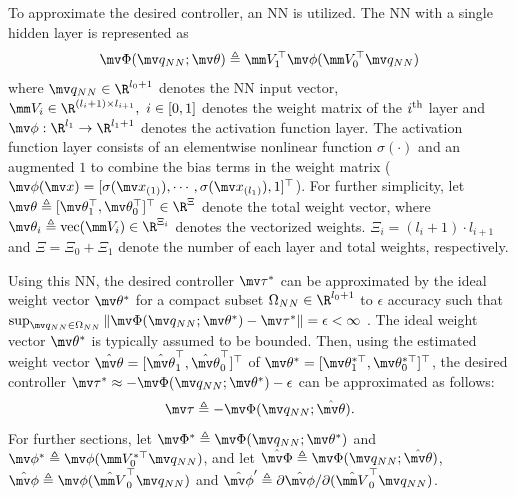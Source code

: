 \documentclass[letterpaper, 10 pt, conference]{ieeeconf}  %
\begin{document}
To approximate the desired controller, an NN is utilized.
The NN with a single hidden layer is represented as 
\begin{equation}
    \mv \Phi({\mv q_{NN}};\mv \theta)\triangleq \mm V_1^\top \mv \phi(\mm V_0^\top {\mv q_{NN}})
\end{equation}
where ${\mv q_{NN}}\in\R^{l_0+1}$ denotes the NN input vector, $\mm V_i\in\R^{(l_i+1)\times l_{i+1}},\ i\in[0,1]$ denotes the weight matrix of the $i\textsuperscript{th}$ layer and $\mv \phi:\R^{l_1}\to\R^{l_1+1}$ denotes the activation function layer.
The activation function layer consists of an elementwise nonlinear function $\sigma(\cdot)$ and an augmented $1$ to combine the bias terms in the weight matrix (\ie $\mv \phi(\mv x) = [\sigma(\mv x_{(1)}),\cdots, \sigma(\mv x_{(l_1)}), 1]^\top $).
For further simplicity, let $\mv \theta\triangleq[\mv \theta_1^\top ,\mv \theta_0^\top ]^\top \in\R^{\Xi}$ denote the total weight vector, where $\mv \theta_i\triangleq \text{vec}(\mm V_i)\in\R^{\Xi_i}$ denotes the vectorized weights.
$\Xi_i=(l_i+1)\cdot l_{i+1}$ and $\Xi=\Xi_0+\Xi_1$ denote the number of each layer and total weights, respectively.

Using this NN, the desired controller $\mv \tau^*$ can be approximated by the ideal weight vector $\mv \theta^*$ for a compact subset $\Omega_{NN}\in\R^{l_0+1}$ to $\epsilon$ accuracy such that $\sup_{{\mv q_{NN}}\in\Omega_{NN}} \allowbreak \Vert\mv \Phi({\mv q_{NN}};\mv \theta^*) - \mv \tau^*\Vert=\epsilon<\infty$ \cite{Cybenko:1989aa}.
The ideal weight vector $\mv \theta^*$ is typically assumed to be bounded.
Then, using the estimated weight vector $\hat{\mv \theta}=[\hat{\mv \theta}_1^\top ,\hat{\mv \theta}_0^\top ]^\top $ of $\mv \theta^*=[\mv \theta_1^{*\top},\mv \theta_0^{*\top}]^\top $, the desired controller $\mv \tau^*\approx -\mv \Phi(\mv q_{NN};\mv \theta^*)-\epsilon$ can be approximated as follows:
\begin{equation}
    \mv \tau \triangleq -\mv \Phi({\mv q_{NN}};\hat{\mv \theta}).
    \label{eq. control law}
\end{equation}
For further sections, let $\mv \Phi^*\triangleq\mv \Phi({\mv q_{NN}};\mv \theta^*)$ and $\mv \phi^* \triangleq\mv \phi(\mm V_0^{*\top}{\mv q_{NN}})$, and let $\hat{\mv \Phi}\triangleq{\mv \Phi}({\mv q_{NN}};\hat{\mv \theta})$, $\hat{\mv \phi} \triangleq\mv \phi(\hat {\mm V}_0^{\top}{\mv q_{NN}})$ and $\hat{\mv \phi}' \triangleq \partial \hat{\mv \phi}/\partial (\hat {\mm V}_0^\top \mv q_{NN})$.
\end{document}
